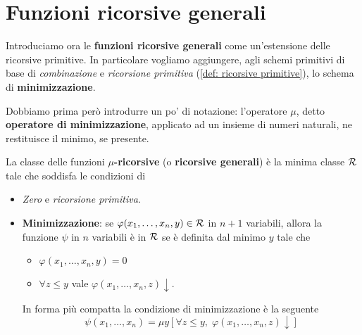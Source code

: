 \chapter{Funzioni ricorsive generali}
Introduciamo ora le \textbf{funzioni ricorsive generali} come
un'estensione delle ricorsive primitive. In particolare vogliamo
aggiungere, agli schemi primitivi di base di \emph{combinazione}
e \emph{ricorsione primitiva} (\ref{def: ricorsive primitive}),
lo schema di \textbf{minimizzazione}.

Dobbiamo prima però introdurre un po' di notazione: l'operatore
$\mu$, detto \textbf{operatore di minimizzazione}, applicato
ad un insieme di numeri naturali, ne restituisce il minimo, se
presente.

\begin{definition} \label{def: mu ricorsive}
	La classe delle funzioni \textbf{$\mu$-ricorsive} (o
	\textbf{ricorsive generali}) è la minima classe
	$\mathcal{R}$ tale che soddisfa le condizioni di
	\begin{itemize}
		\item \emph{Zero} e \emph{ricorsione primitiva}.
		\item \textbf{Minimizzazione}: se
		      $\varphi (x_1, \dots, x_n, y) \in \mathcal{R}$ in $n+1$
		      variabili, allora la funzione $\psi$ in $n$
		      variabili è in $\mathcal{R}$ se è definita dal minimo $y$
		      tale che
		      \begin{itemize}
			      \item $\varphi(x_1, \dots, x_n, y) = 0$
			      \item $\forall z \leq y$ vale $\varphi(x_1,
				            \dots, x_n, z) \downarrow$.
		      \end{itemize}
		      In forma più compatta la condizione di
		      minimizzazione è la seguente
		      \[
			      \psi (x_1, \dots, x_n) = \mu y [
					      \forall z \leq y, \;
					      \varphi(x_1, \dots, x_n, z)
					      \downarrow]
		      \]
	\end{itemize}
\end{definition}

